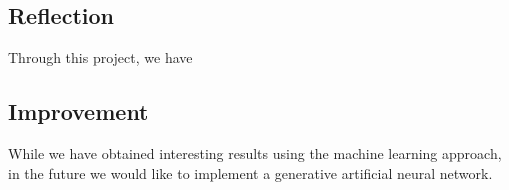 \documentclass[10pt,a4paper]{article}
\begin{document}
\subsection{Reflection}
%
Through this project, we have 

\subsection{Improvement}
%

While we have obtained interesting results using the machine learning approach, in the future we would like to implement a generative artificial neural network.


%
\end{document}
